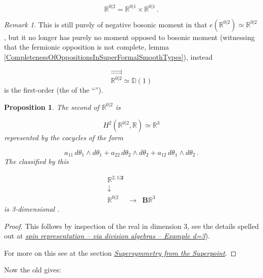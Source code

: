 \documentclass[12pt,titlepage]{article}
\newcommand{\itexarray}[1]{\begin{matrix}#1\end{matrix}}
\theoremstyle{plain}
\newtheorem{prop}{Proposition}
\theoremstyle{definition}
\theoremstyle{remark}
\newtheorem{remark}{Remark}
\begin{document}
\begin{displaymath}
\mathbb{R}^{0|2}
  =
  \mathbb{R}^{0|1}\times \mathbb{R}^{0|1}
  \,.
\end{displaymath}
\begin{remark}
\label{}\hypertarget{}{}
This is still purely of negative bosonic moment in that $e(\mathbb{R}^{0|2}) \simeq \mathbb{R}^{0|2}$, but it no longer has purely no moment opposed to bosonic moment (witnessing that the fermionic opposition is not complete, lemma \ref{CompletenessOfOppositionsInSuperFormalSmoothTypes}), instead

\begin{displaymath}
\stackrel{\rightrightarrows}{\mathbb{R}^{0|2}}
  \simeq
  \mathbb{D}(1)
\end{displaymath}
is the first-order  (the  of the ``'').

\end{remark}
\begin{prop}
\label{3dSuperMinkowskiSpacetime}\hypertarget{3dSuperMinkowskiSpacetime}{}
The second   of $\mathbb{R}^{0\vert 2}$ is

\begin{displaymath}
H^2(\mathbb{R}^{0\vert 2}, \mathbb{R})
  \simeq
  \mathbb{R}^3
\end{displaymath}
represented by the cocycles of the form

\begin{displaymath}
a_{11}
  \,
  d\theta_1 \wedge d\theta_1
   +
  a_{22}
  \,
  d\theta_2 \wedge d\theta_2
  +
  a_{12}
  \,
  d\theta_1 \wedge d\theta_2
  \,.
\end{displaymath}
The  classified by this

\begin{displaymath}
\itexarray{
     \mathbb{R}^{2,1|\mathbf{2}}
     \\
     \downarrow
     \\
     \mathbb{R}^{0|2}
     &\stackrel{}{\longrightarrow}&
     \mathbf{B} \mathbb{R}^3
  }
\end{displaymath}
is 3-dimensional .

\end{prop}
\begin{proof}
This follows by inspection of the real  in dimension 3, see the details spelled out at \emph{\href{http://ncatlab.org/nlab/show/spin%20representation#RealSpinorRepsIn3d}{spin representation -- via division algebras -- Example d=3}}).

For more on this see at \emph{} the section \emph{\href{https://ncatlab.org/nlab/show/geometry+of+physics+--+supersymmetry#SupersymmetryFromTheSuperpoint}{Supersymmetry from the Superpoint}}.

\end{proof}
Now the old  gives:
\end{document}
